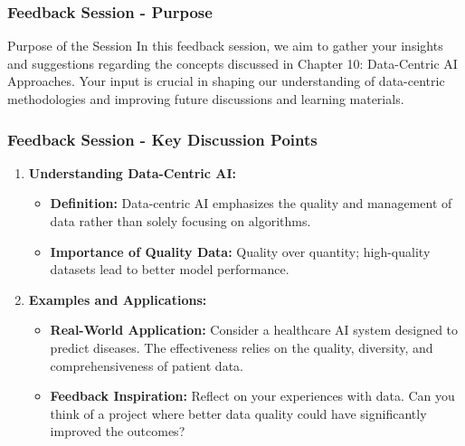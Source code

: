 \documentclass[aspectratio=169]{beamer}
\begin{document}
\begin{frame}[fragile]
    \frametitle{Feedback Session - Purpose}
    \begin{block}{Purpose of the Session}
        In this feedback session, we aim to gather your insights and suggestions 
        regarding the concepts discussed in Chapter 10: Data-Centric AI Approaches. 
        Your input is crucial in shaping our understanding of data-centric methodologies 
        and improving future discussions and learning materials.
    \end{block}
\end{frame}

\begin{frame}[fragile]
    \frametitle{Feedback Session - Key Discussion Points}
    \begin{enumerate}
        \item \textbf{Understanding Data-Centric AI:}
            \begin{itemize}
                \item \textbf{Definition:} Data-centric AI emphasizes the quality and 
                management of data rather than solely focusing on algorithms.
                \item \textbf{Importance of Quality Data:} Quality over quantity; 
                high-quality datasets lead to better model performance.
            \end{itemize}
        
        \item \textbf{Examples and Applications:}
            \begin{itemize}
                \item \textbf{Real-World Application:} Consider a healthcare AI system 
                designed to predict diseases. The effectiveness relies on the quality, 
                diversity, and comprehensiveness of patient data.
                \item \textbf{Feedback Inspiration:} Reflect on your experiences with 
                data. Can you think of a project where better data quality could have 
                significantly improved the outcomes?
            \end{itemize}
    \end{enumerate}
\end{frame}
\end{document}
